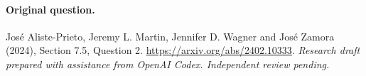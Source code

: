\documentclass[11pt]{article}
\begin{document}
\paragraph{Original question.} José Aliste-Prieto, Jeremy L. Martin, Jennifer D. Wagner and José Zamora (2024), Section 7.5, Question 2. \url{https://arxiv.org/abs/2402.10333}.
\medskip\noindent\textit{Research draft prepared with assistance from OpenAI Codex. Independent review pending.}
\end{document}
